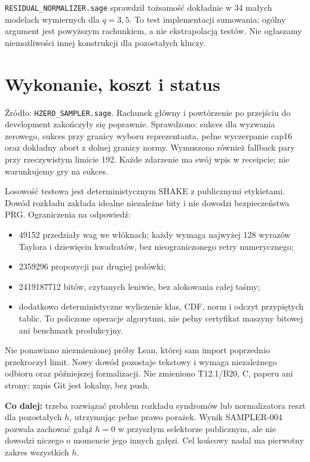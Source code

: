 \documentclass[11pt,a4paper]{article}
\newcommand{\code}[1]{\nolinkurl{#1}}
\begin{document}
\code{RESIDUAL_NORMALIZER.sage} sprawdził tożsamość dokładnie w 34 małych
modelach wymiernych dla $q=3,5$. To test implementacji sumowania;
ogólny argument jest powyższym rachunkiem, a nie ekstrapolacją testów.
Nie ogłaszamy niemożliwości innej konstrukcji dla pozostałych kluczy.

\section{Wykonanie, koszt i status}
Źródło: \code{HZERO_SAMPLER.sage}. Rachunek główny i powtórzenie po
przejściu do development zakończyły się poprawnie. Sprawdzono:
sukces dla wyzwania zerowego, sukces przy granicy wyboru reprezentanta,
pełne wyczerpanie cap16 oraz dokładny abort z dolnej granicy normy.
Wymuszono również fallback pary przy rzeczywistym limicie 192.
Każde zdarzenie ma swój wpis w receipcie; nie warunkujemy gry na sukces.

Losowość testowa jest deterministycznym SHAKE z publicznymi etykietami.
Dowód rozkładu zakłada idealne niezależne bity i nie dowodzi bezpieczeństwa PRG.
Ograniczenia na odpowiedź:
\begin{itemize}
\item 49152 przedziały wag we włóknach; każdy wymaga najwyżej 128 wyrazów
Taylora i dziewięciu kwadratów, bez nieograniczonego retry numerycznego;
\item 2359296 propozycji par drugiej połówki;
\item 2419187712 bitów, czytanych leniwie, bez alokowania całej taśmy;
\item dodatkowo deterministyczne wyliczenie klas, CDF, norm i odczyt
przypiętych tablic. To policzone operacje algorytmu, nie pełny certyfikat
maszyny bitowej ani benchmark produkcyjny.
\end{itemize}

Nie ponawiano niezmienionej próby Lean, której sam import poprzednio
przekroczył limit. Nowy dowód pozostaje tekstowy i wymaga niezależnego
odbioru oraz późniejszej formalizacji. Nie zmieniono T12.1/B20, C,
paperu ani strony; zapis Git jest lokalny, bez push.

\textbf{Co dalej:} trzeba rozwiązać problem rozkładu syndromów lub
normalizatora reszt dla pozostałych $h$, utrzymując pełne prawo porażek.
Wynik SAMPLER-004 pozwala zachować gałąź $h=0$ w przyszłym selektorze
publicznym, ale nie dowodzi niczego o momencie jego innych gałęzi.
Cel końcowy nadal ma pierwotny zakres wszystkich $h$.
\end{document}
